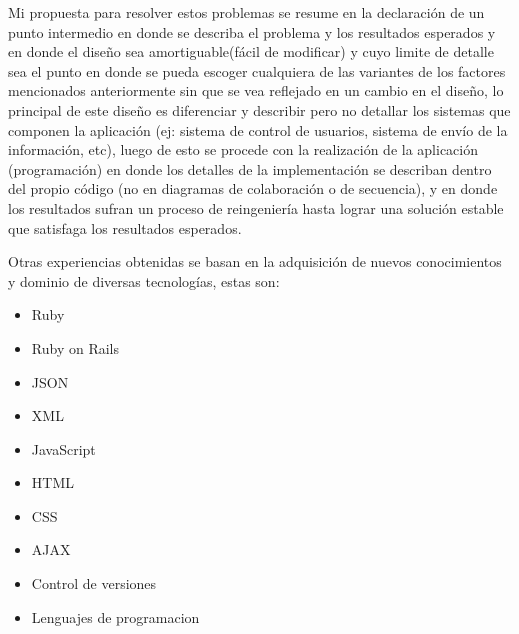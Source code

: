 Mi propuesta para resolver estos problemas se resume en la declaración de un punto intermedio en donde se describa el problema y los resultados esperados y en donde el diseño sea amortiguable(fácil de modificar) y cuyo limite de detalle sea el punto en donde se pueda escoger cualquiera de las variantes de los factores mencionados anteriormente sin que se vea reflejado en un cambio en el diseño, lo principal de este diseño es diferenciar y describir pero no detallar los sistemas que componen la aplicación (ej: sistema de control de usuarios, sistema de envío de la información, etc), luego de esto se procede con la realización de la aplicación (programación) en donde los detalles de la implementación se describan dentro del propio código (no en diagramas de colaboración o de secuencia), y en donde los resultados sufran un proceso de reingeniería hasta lograr una solución estable que satisfaga los resultados esperados.

Otras experiencias obtenidas se basan en la adquisición de nuevos conocimientos y dominio de diversas tecnologías, estas son:

\begin{itemize}
	\item Ruby
	\item Ruby on Rails
	\item JSON
	\item XML
	\item JavaScript
	\item HTML
	\item CSS
	\item AJAX
	\item Control de versiones
	\item Lenguajes de programacion
\end{itemize}